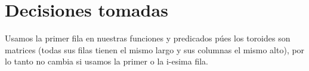 \documentclass[spanish, a4paper]{article}
\begin{document}
\section{Decisiones tomadas}


Usamos la primer fila en nuestras funciones y predicados púes los toroides son matrices (todas sus filas tienen el mismo largo y sus columnas el mismo alto), por lo tanto no cambia si usamos la primer o la i-esima fila. 
\end{document}
